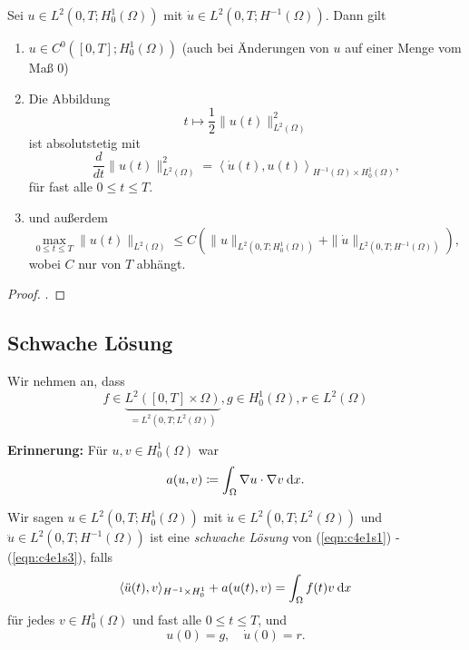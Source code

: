\documentclass[../skript.tex]{subfiles}
\begin{document}
\begin{theorem}\label{thm:c4s2s6}
	Sei $u\in L^2(0,T;H^1_0(\Omega))$ mit $\dot{u}\in L^2(0,T;H^{-1}(\Omega))$. Dann gilt
	\begin{enumerate}
		\item $u\in C^0([0,T];H^1_0(\Omega))$ (auch bei Änderungen von $u$ auf einer Menge vom Maß $0$)
		\item Die Abbildung 
			\[
				t\mapsto \frac{1}{2} \|u(t)\|_{L^2(\Omega)}^2
			\]
			ist absolutstetig mit
			\[
				\frac{d}{dt} \|u(t)\|_{L^2(\Omega)}^2  = \left\langle \dot{u}(t),u(t)\right\rangle_{H^{-1}(\Omega)\times H^1_0(\Omega)},
			\]
			für fast alle $0\leq t\leq T$.
		\item und außerdem
			\[ 
				\max_{0\leq t\leq T} \|u(t)\|_{L^2(\Omega)} \leq C\left( \|u\|_{L^2(0,T;H^1_0(\Omega))} + \|\dot{u}\|_{L^2(0,T;H^{-1}(\Omega))} \right),
			\]
			wobei $C$ nur von $T$ abhängt.
	\end{enumerate}
\end{theorem}

\begin{proof}
	\cite[S.287]{Evans}.
\end{proof}


\subsection{Schwache Lösung}\label{sec:c4e3}
Wir nehmen an, dass
\begin{equation}\label{eqn:c4e3s1}
	f\in \underbrace{L^2([0,T]\times\Omega)}_{=L^2(0,T;L^2(\Omega))}, g\in H^1_0(\Omega), r\in L^2(\Omega)
\end{equation}

\textbf{Erinnerung: } Für $u,v\in H^1_0(\Omega)$ war 
\[
	a(u,v) \coloneqq \int_\Omega \nabla u\cdot\nabla v\:\mathrm{d}x.
\]

\begin{definition}\label{def:c4e3s1}
	Wir sagen $u\in L^2(0,T;H^1_0(\Omega))$ mit $\dot{u}\in L^2(0,T;L^2(\Omega))$ und $\ddot{u}\in L^2(0,T;H^{-1}(\Omega))$ ist eine \emph{schwache Lösung} von (\ref{eqn:c4e1s1}) - (\ref{eqn:c4e1s3}), falls
	\begin{equation}\label{eqn:c4e3s2}
		\langle\ddot{u}(t),v\rangle_{H^{-1}\times H^1_0} + a(u(t),v) = \int_\Omega f(t)v\:\mathrm{d}x
	\end{equation}
	für jedes $v\in H^1_0(\Omega)$ und fast alle $0\leq t\leq T$, und 
	\begin{equation}\label{eqn:c4e3s3}
		u(0) = g,\quad\dot{u}(0) = r.
	\end{equation}
\end{definition}
\end{document}
